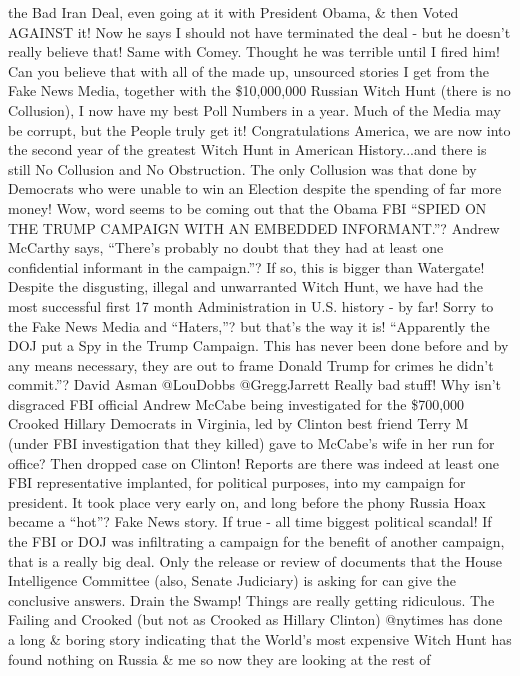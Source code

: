 the Bad Iran Deal, even going at it with President Obama, \& then Voted
AGAINST it! Now he says I should not have terminated the deal - but he
doesn't really believe that! Same with Comey. Thought he was terrible
until I fired him! Can you believe that with all of the made up,
unsourced stories I get from the Fake News Media, together with the
\$10,000,000 Russian Witch Hunt (there is no Collusion), I now have my
best Poll Numbers in a year. Much of the Media may be corrupt, but the
People truly get it! Congratulations America, we are now into the second
year of the greatest Witch Hunt in American History...and there is still
No Collusion and No Obstruction. The only Collusion was that done by
Democrats who were unable to win an Election despite the spending of far
more money! Wow, word seems to be coming out that the Obama FBI ``SPIED
ON THE TRUMP CAMPAIGN WITH AN EMBEDDED INFORMANT.''? Andrew McCarthy
says, ``There's probably no doubt that they had at least one
confidential informant in the campaign.''? If so, this is bigger than
Watergate! Despite the disgusting, illegal and unwarranted Witch Hunt,
we have had the most successful first 17 month Administration in U.S.
history - by far! Sorry to the Fake News Media and ``Haters,''? but
that's the way it is! ``Apparently the DOJ put a Spy in the Trump
Campaign. This has never been done before and by any means necessary,
they are out to frame Donald Trump for crimes he didn't commit.''? David
Asman @LouDobbs @GreggJarrett Really bad stuff! Why isn't disgraced FBI
official Andrew McCabe being investigated for the \$700,000 Crooked
Hillary Democrats in Virginia, led by Clinton best friend Terry M (under
FBI investigation that they killed) gave to McCabe's wife in her run for
office? Then dropped case on Clinton! Reports are there was indeed at
least one FBI representative implanted, for political purposes, into my
campaign for president. It took place very early on, and long before the
phony Russia Hoax became a ``hot''? Fake News story. If true - all time
biggest political scandal! If the FBI or DOJ was infiltrating a campaign
for the benefit of another campaign, that is a really big deal. Only the
release or review of documents that the House Intelligence Committee
(also, Senate Judiciary) is asking for can give the conclusive answers.
Drain the Swamp! Things are really getting ridiculous. The Failing and
Crooked (but not as Crooked as Hillary Clinton) @nytimes has done a long
\& boring story indicating that the World's most expensive Witch Hunt
has found nothing on Russia \& me so now they are looking at the rest of
